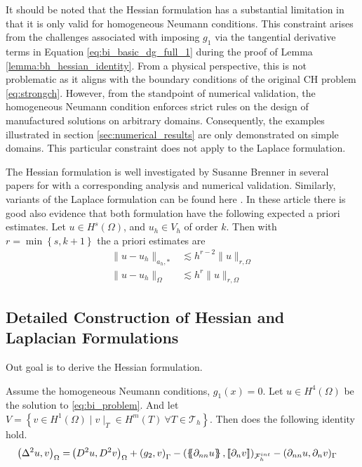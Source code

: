 \begin{remark}
It should be noted that the Hessian formulation has a substantial limitation in that it is only valid for homogeneous Neumann conditions. This constraint arises from the challenges associated with imposing $g_{1}$ via the tangential derivative terms in Equation \eqref{eq:bi_basic_dg_full_1} during the proof of Lemma \ref{lemma:bh_hessian_identity}.
From a physical perspective, this is not problematic as it aligns with the boundary conditions of the original CH problem \eqref{eq:strongch}. However, from the standpoint of numerical validation, the homogeneous Neumann condition enforces strict
rules on the design of manufactured solutions on arbitrary domains. Consequently, the examples illustrated in section \ref{sec:numerical_results} are only demonstrated on simple domains. This particular constraint does not apply to the Laplace formulation.
\end{remark}

The Hessian formulation is well investigated by Susanne Brenner in several papers for \cite{brenner2012, brenner2012quadratic, brenner2012quadratic_kirk} with a corresponding analysis and numerical validation. Similarly, variants of the Laplace formulation can be found here
\cite{feng2007fully, georgoulis2009discontinuous}. In these article there is good also evidence  that both formulation have the following expected a priori estimates. Let  $u \in H^{s}( \Omega ) $, and $u_{h}\in  V_{h}  $ of order $k$. Then with $r = \min\left\{ s,
k+1 \right\}$ the a priori estimates are   \[
    \begin{split}
\| u - u_{h} \|_{ a_{h},*  }^{  }  & \lesssim  h^{r-2} \| u \|_{ r, \Omega  }^{  } \\
\| u - u_{h} \|_{ \Omega   }^{  }  & \lesssim  h^{r} \| u \|_{ r,\Omega  }^{  }
    \end{split}
\]

\subsection{Detailed Construction of Hessian and Laplacian Formulations }%
\label{sub:construction_of_laplacian_cip}

Out goal is to derive the Hessian formulation.

\begin{lemma}
    \label{lemma:bh_hessian_identity}
    Assume the homogeneous Neumann conditions, $g_1( x ) = 0 $.
Let $u \in H^{4}( \Omega ) $ be the solution to \eqref{eq:bi_problem}.  And let $V = \left\{ v \in H^{1}( \Omega )  \mid  v \mid _{T} \in H^{m}( T) \ \forall T \in \mathcal{T} _{h}   \right\} $. Then does the following identity hold.
\begin{equation}
\label{eq:bi_basic_dg_full}
\begin{split}
    \left( \Delta  ^{2} u, v \right) _{\Omega }  =&   \left( D^2u, D^2v \right)_{\Omega } +  \left(g_{2}, v  \right) _{ \Gamma  }  -  ( \left\{\!\!\left\{ \partial _{nn} u \right\}\!\!\right\}   , \left[\!\left[  \partial_{n} v  \right]\!\right] )_{\mathcal{F}_{h}^{int} }  - ( \partial _{nn} u , \partial _{n} v)_{\Gamma  }
\end{split}
\end{equation}

\end{lemma}

